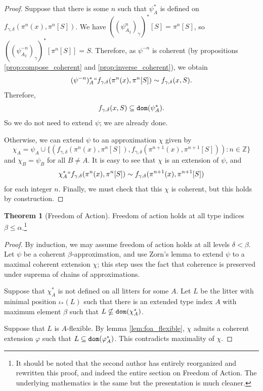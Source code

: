 \documentclass{article}
\theoremstyle{definition}
\newtheorem{theorem}{Theorem}[section]
\theoremstyle{remark}
\begin{document}
{\begin{proof}
  Suppose that there is some $n$ such that $\psi_A^*$ is defined on $f_{\gamma,\delta}(\pi^n(x), \pi^n[S])$.
  We have $((\psi_{A_2}^n)_\gamma)^*[S] = \pi^n[S]$, so $((\psi_{A_2}^{-n})_\gamma)^*[\pi^n[S]] = S$.
  Therefore, as $\psi^{-n}$ is coherent (by propositions \ref{prop:compose_coherent} and \ref{prop:inverse_coherent}), we obtain
  $$ (\psi^{-n})_A^* `` f_{\gamma,\delta}(\pi^n(x), \pi^n[S]) \sim f_{\gamma,\delta}(x, S). $$
  Therefore,
  $$ f_{\gamma,\delta}(x, S) \subseteq {\tt dom}(\psi_A^*).$$
  So we do not need to extend $\psi$; we are already done.

  Otherwise, we can extend $\psi$ to an approximation $\chi$ given by
  \[ \chi_A = \psi_A \cup \{ (f_{\gamma,\delta}(\pi^n(x), \pi^n[S]), f_{\gamma,\delta}(\pi^{n+1}(x), \pi^{n+1}[S])) : n \in \mathbb Z \} \]
  and \( \chi_B = \psi_B \) for all \( B \neq A \).
  It is easy to see that \( \chi \) is an extension of \( \psi \), and
  $$ \chi_A^* `` f_{\gamma,\delta}(\pi^n(x), \pi^n[S]) \sim f_{\gamma,\delta}(\pi^{n+1}(x), \pi^{n+1}[S]) $$
  for each integer $n$.
  Finally, we must check that this $\chi$ is coherent, but this holds by construction.
\end{proof}
\begin{theorem}[Freedom of Action]\label{thm:foa}
  Freedom of action holds at all type indices $\beta \leq \alpha$.\footnote{It should be noted that the second author has entirely reorganized and rewritten this proof, and indeed the entire section on Freedom of Action.  The underlying mathematics is the same but the presentation is much cleaner.}
\end{theorem}
\begin{proof}
  By induction, we may assume freedom of action holds at all levels $\delta < \beta$.
  Let $\psi$ be a coherent $\beta$-approximation, and use Zorn's lemma to extend $\psi$ to a maximal coherent extension $\chi$; this step uses the fact that coherence is preserved under suprema of chains of approximations.

  Suppose that $\chi_A^*$ is not defined on all litters for some $A$.
  Let $L$ be the litter with minimal position $\iota_*(L)$ such that there is
  an extended type index $A$
  with maximum element $\beta$ such that $L \nsubseteq {\tt dom}(\chi_A^*)$.

  Suppose that $L$ is $A$-flexible.
  By lemma \ref{lem:foa_flexible}, $\chi$ admits a coherent extension $\varphi$ such that $L \subseteq {\tt dom}(\varphi_A^*)$.
  This contradicts maximality of $\chi$.


\end{proof}}
\end{document}
